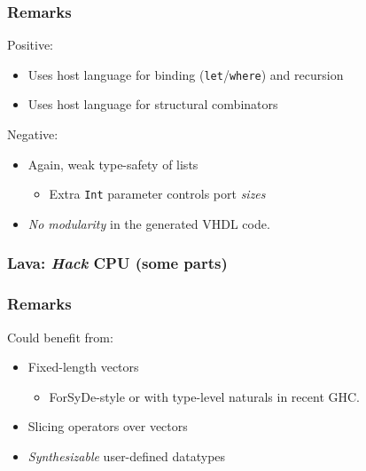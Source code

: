 \documentclass{beamer}
\begin{document}
            \begin{frame}
                \frametitle{Remarks}

                \par{Positive:}
                \begin{itemize}
                    \item Uses host language for binding (\texttt{let}/\texttt{where}) and recursion
                    \item Uses host language for structural combinators
                \end{itemize}

                \par{Negative:}
                \begin{itemize}
                    \item Again, weak type-safety of lists
                        \begin{itemize}
                            \item Extra \texttt{Int} parameter controls port \emph{sizes}
                        \end{itemize}
                    \item \emph{No modularity} in the generated VHDL code.
                \end{itemize}
            \end{frame}

            \begin{frame}
                \frametitle{Lava: \emph{Hack} CPU (some parts)}
            \end{frame}

            \begin{frame}
                \frametitle{Remarks}

                \par{Could benefit from:}
                \begin{itemize}
                    \item Fixed-length vectors
                        \begin{itemize}
                            \item ForSyDe-style or with type-level naturals in recent GHC.
                        \end{itemize}
                    \item Slicing operators over vectors
                    \item \emph{Synthesizable} user-defined datatypes
                \end{itemize}
            \end{frame}
\end{document}

